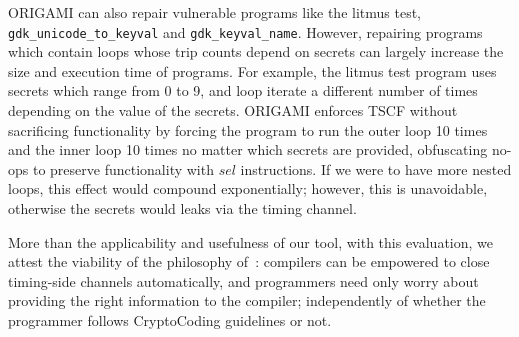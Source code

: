 ORIGAMI can also repair vulnerable programs like the litmus test, \texttt{gdk\_unicode\_to\_keyval} and \texttt{gdk\_keyval\_name}. 
However, repairing programs which contain loops whose trip counts depend on secrets can largely increase the size and execution time of programs. For example, the litmus test program uses secrets which range from 0 to 9, and loop iterate a different number of times depending on the value of the secrets. ORIGAMI enforces TSCF without sacrificing functionality by forcing the program to run the outer loop 10 times and the inner loop 10 times no matter which secrets are provided, obfuscating no-ops to preserve functionality with $sel$ instructions. If we were to have more nested loops, this effect would compound exponentially; however, this is unavoidable, otherwise the secrets would leaks via the timing channel. 



More than the applicability and usefulness of our tool, with this evaluation, we attest the viability of the philosophy of~\cite{WhatYouCisWhatYouGet}: compilers can be empowered to close timing-side channels automatically, and programmers need only worry about providing the right information to the compiler; independently of whether the programmer follows CryptoCoding guidelines or not.
 

